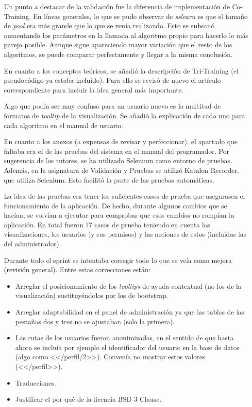 Un punto a destacar de la validación fue la diferencia de implementación de
Co-Training. En líneas generales, lo que se pudo observar de \emph{sslearn} es
que el tamaño de \textit{pool} era más grande que lo que se venía realizando.
Esto se subsanó aumentando los parámetros en la llamada al algoritmo propio para
hacerlo lo más parejo posible. Aunque sigue apareciendo mayor variación que el
resto de los algoritmos, se puede comparar perfectamente y llegar a la misma
conclusión.

En cuanto a los conceptos teóricos, se añadió la descripción de Tri-Training (el
pseudocódigo ya estaba incluido). Para ello se revisó de nuevo el artículo
correspondiente para incluir la idea general más importante.

Algo que podía ser muy confuso para un usuario nuevo es la multitud de formatos
de \textit{tooltip} de la visualización. Se añadió la explicación de cada uno
para cada algoritmo en el manual de usuario.

En cuanto a los anexos (a expensas de revisar y perfeccionar), el apartado que
faltaba era el de las pruebas del sistema en el manual del programador. Por
sugerencia de los tutores, se ha utilizado Selenium como entorno de pruebas.
Además, en la asignatura de Validación y Pruebas se utilizó Katalon Recorder,
que utiliza Selenium. Esto facilitó la parte de las pruebas automáticas.

La idea de las pruebas era tener los suficientes casos de prueba que asegurasen
el funcionamiento de la aplicación. De hecho, durante algunos cambios que se
hacían, se volvían a ejecutar para comprobar que esos cambios no rompían la
aplicación. En total fueron 17 casos de prueba teniendo en cuenta las
visualizaciones, los usuarios (y sus permisos) y las acciones de estos
(incluidas las del administrador).

Durante todo el sprint se intentaba corregir todo lo que se veía como mejora
(revisión general). Entre estas correcciones están:
\begin{itemize}
    \item Arreglar el posicionamiento de los \textit{tooltips} de ayuda
    contextual (no los de la visualización) sustituyéndolos por los de bootstrap.
    \item Arreglar adaptabilidad en el panel de administración ya que las tablas
    de las pestañas dos y tres no se ajustaban (solo la primera).
    \item Las rutas de los usuarios fueron anonimizadas, en el sentido de que
    hasta ahora se incluía por ejemplo el identificador del usuario en la base
    de datos (algo como <</perfil/2>>). Convenía no mostrar estos valores
    (<</perfil>>).
    \item Traducciones.
    \item Justificar el por qué de la licencia BSD 3-Clause.
\end{itemize}


